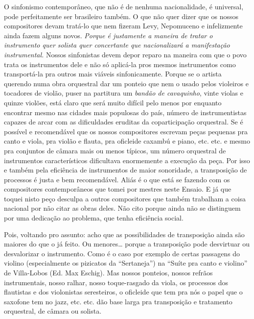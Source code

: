 O sinfonismo contemporâneo, que não é de nenhuma nacionalidade, é
universal, pode perfeitamente ser brasileiro também. O que não quer
dizer que os nossos compositores devam tratá-lo que nem fizeram Levy,
Nepomuceno e infelizmente ainda fazem alguns novos. \emph{Porque é
justamente a maneira de tratar o instrumento quer solista quer
concertante que nacionalizará a manifestação instrumental.} Nossos
sinfonistas devem depor reparo na maneira com que o povo trata os
instrumentos dele e não só aplicá-la pros mesmos instrumentos como
transportá-la pra outros mais viáveis sinfonicamente. Porque se o
artista querendo numa obra orquestral dar um ponteio que nem o usado
pelos violeiros e tocadores de violão, puser na partitura um
\emph{bandão de cavaquinho}, vinte violas e quinze violões, está claro
que será muito difícil pelo menos por enquanto encontrar mesmo nas
cidades mais populosas do país, número de instrumentistas capazes de
arcar com as dificuldades eruditas da coparticipação orquestral. Se é
possível e recomendável que os nossos compositores escrevam peças
pequenas pra canto e viola, pra violão e flauta, pra oficleide caxambú e
piano, etc. etc. e mesmo pra conjuntos de câmara mais ou menos típicos,
um número orquestral de instrumentos característicos dificultava
enormemente a execução da peça. Por isso e também pela eficiência de
instrumentos de maior sonoridade, a transposição de processos é justa e
bem recomendável. Aliás é o que está se fazendo com os compositores
contemporâneos que tomei por mestres neste Ensaio. E já que toquei nisto
peço desculpa a outros compositores que também trabalham a coisa
nacional por não citar as obras deles. Não cito porque ainda não se
distinguem por uma dedicação ao problema, que tenha eficiência social.

Pois, voltando pro assunto: acho que as possibilidades de transposição
ainda são maiores do que o já feito. Ou menores\ldots{} porque a transposição
pode desvirtuar ou desvalorizar o instrumento. Como é o caso por exemplo
de certas passagens do violino (especialmente os pizicatos da
``Sertaneja'') na ``Suíte pra canto e violino'' de Villa-Lobos (Ed. Max
Eschig). Mas nossos ponteios, nossos refrãos instrumentais, nosso
ralhar, nosso toque-rasgado da viola, os processos dos flautistas e dos
violonistas seresteiros, o oficleide que tem pra nós o papel que o
saxofone tem no jazz, etc. etc. dão base larga pra transposição e
tratamento orquestral, de câmara ou solista.

